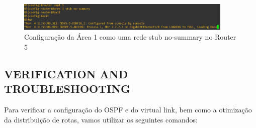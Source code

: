 \documentclass[11pt,english, openright, oneside]{book}
\begin{document}
\begin{figure}[H]
    \centering
    \includegraphics[width=0.92\textwidth]{imagens/Tarefa3/14.optimizing_route_R5.png}
    \caption{Configuração da Área 1 como uma rede stub no-summary no Router 5}
    \label{fig:config22}
\end{figure}
\vspace{0.2cm}

\newpage
\subsection{VERIFICATION AND TROUBLESHOOTING}
\vspace{0.2cm}

Para verificar a configuração do OSPF e do virtual link, bem como a otimização da distribuição de rotas, vamos utilizar os seguintes comandos:
\vspace{0.2cm}
\end{document}
